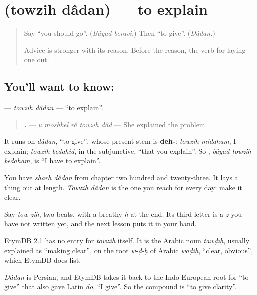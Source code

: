 \section[\texorpdfstring{\fa{توضیح} \fa{دادن} (towzih dâdan)}{توضیح دادن (towzih dâdan)}]{  (towzih dâdan) — to explain}

\label{lesson:FA-C293-towzih-dadan}



\begin{quote}
Say \textquotedblleft{}you should go\textquotedblright{}. (\emph{Bâyad beravi.}) Then \textquotedblleft{}to give\textquotedblright{}. (\emph{Dâdan.})

Advice is stronger with its reason. Before the reason, the verb for laying one out.
\end{quote}

\subsection*{You'll want to know:  }
\textbf{ } — \emph{towzih dâdan} — \textquotedblleft{}to explain\textquotedblright{}.

\begin{quote}
\textbf{    .} — \emph{u moshkel râ towzih dâd} — She explained the problem.
\end{quote}

It runs on \emph{dâdan}, \textquotedblleft{}to give\textquotedblright{}, whose present stem is \textbf{deh-}: \emph{towzih midaham}, I explain; \emph{towzih bedahid}, in the subjunctive, \textquotedblleft{}that you explain\textquotedblright{}. So \textbf{  }, \emph{bâyad towzih bedaham}, is \textquotedblleft{}I have to explain\textquotedblright{}.

You have \emph{sharh dâdan} from chapter two hundred and twenty-three. It lays a thing out at length. \emph{Towzih dâdan} is the one you reach for every day: make it clear.

Say \emph{tow-zih}, two beats, with a breathy \emph{h} at the end. Its third letter is a \emph{z} you have not written yet, and the next lesson puts it in your hand.

\begin{cousinweb}
EtymDB 2.1 has no entry for \emph{towzih} itself. It is the Arabic noun \emph{tawḍīḥ}, usually explained as \textquotedblleft{}making clear\textquotedblright{}, on the root \emph{w-ḍ-ḥ} of Arabic \emph{wāḍiḥ}, \textquotedblleft{}clear, obvious\textquotedblright{}, which EtymDB does list.

\emph{Dâdan} is Persian, and EtymDB takes it back to the Indo-European root for \textquotedblleft{}to give\textquotedblright{} that also gave Latin \emph{dō}, \textquotedblleft{}I give\textquotedblright{}. So the compound is \textquotedblleft{}to give clarity\textquotedblright{}.
\end{cousinweb}

